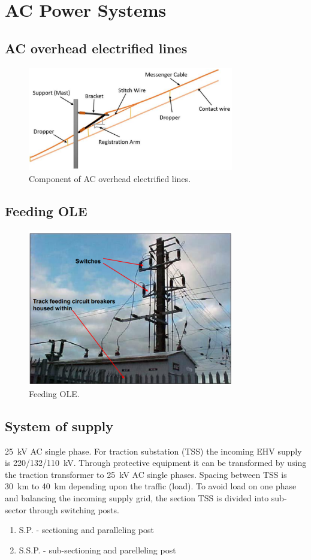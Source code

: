 \section{AC Power Systems}
\subsection{AC overhead electrified lines}
\begin{figure}[H]
    \centering
    \includegraphics[width = 0.8\textwidth]{img/figure130.png}
    \caption{Component of AC overhead electrified lines.}
\end{figure}
\subsection{Feeding OLE}
\begin{figure}[H]
    \centering
    \includegraphics[width = 0.8\textwidth]{img/figure131.png}
    \caption{Feeding OLE.}
\end{figure}
\subsection{System of supply}
\SI{25}{\kilo\volt} AC single phase. For traction substation (TSS) the incoming EHV supply is 220/132/\SI{110}{\kilo\volt}. Through protective equipment it can be transformed by using the traction transformer to \SI{25}{\kilo\volt} AC single phases. Spacing between TSS is \SI{30}{\kilo\meter} to \SI{40}{\kilo\meter} depending upon the traffic (load). To avoid load on one phase and balancing the incoming supply grid, the section TSS is divided into sub-sector through switching posts. 
\begin{enumerate}
    \item S.P. - sectioning and paralleling post
    \item S.S.P. - sub-sectioning and parelleling post
\end{enumerate}
